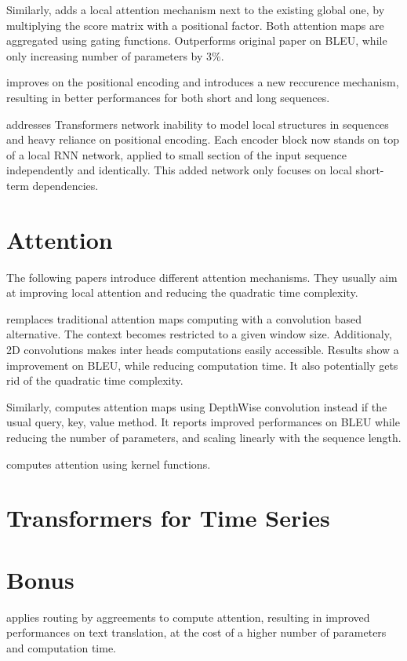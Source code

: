 \documentclass{report}
\begin{document}
    Similarly, \cite{Xu2019LeveragingLA} adds a local attention mechanism next to the existing global one, by multiplying the score matrix with a positional factor. Both attention maps are aggregated using gating functions. Outperforms original paper on BLEU, while only increasing number of parameters by 3\%.

    \cite[Transformer-XL]{Dai2019TransformerXLAL} improves on the positional encoding and introduces a new reccurence mechanism, resulting in better performances for both short and long sequences.

    \cite[R-Transformer]{Wang2019RTransformerRN} addresses Transformers network inability to model local structures in sequences and heavy reliance on positional encoding. Each encoder block now stands on top of a local RNN network, applied to small section of the input sequence independently and identically. This added network only focuses on local short-term dependencies.

    

\section{Attention}

    The following papers introduce different attention mechanisms. They usually aim at improving local attention and reducing the quadratic time complexity.

    \cite{Yang2019ConvolutionalSN} remplaces traditional attention maps computing with a convolution based alternative. The context becomes restricted to a given window size. Additionaly, 2D convolutions makes inter heads computations easily accessible. Results show a improvement on BLEU, while reducing computation time. It also potentially gets rid of the quadratic time complexity.

    Similarly, \cite{Wu2019PayLA} computes attention maps using DepthWise convolution instead if the usual query, key, value method. It reports improved performances on BLEU while reducing the number of parameters,
    and scaling linearly with the sequence length.

    \cite{Tsai2019TransformerDA} computes attention using kernel functions.
    
    

\section{Transformers for Time Series}

\section{Bonus}

    \cite{Li2019InformationAF} applies routing by aggreements to compute attention, resulting in improved performances on text translation, at the cost of a higher number of parameters and computation time.




\end{document}
